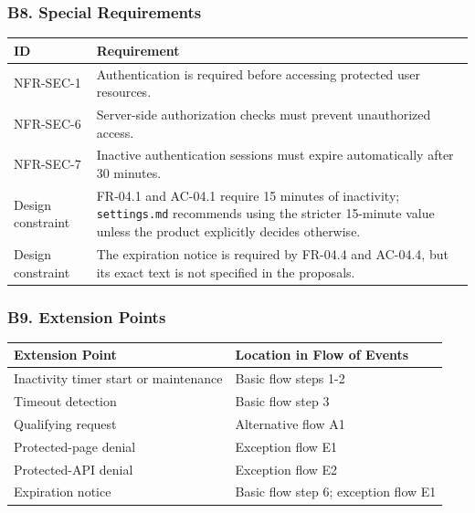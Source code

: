 \documentclass[12pt]{article}
\renewcommand{\baselinestretch}{1.5}
\begin{document}
\hypertarget{sec:b8-special-requirements}{}
\subsubsection*{B8. Special Requirements}
\par\medskip

\begingroup
\small
\renewcommand{\baselinestretch}{1.0}\selectfont
\renewcommand{\arraystretch}{1.15}
\setlength{\tabcolsep}{6pt}
\begin{longtable}{|>{\raggedright\arraybackslash}p{}|>{\raggedright\arraybackslash}p{}|}
\hline
\textbf{ID} & \textbf{Requirement} \\ \hline
\endhead
NFR-SEC-1 & Authentication is required before accessing protected user resources. \\ \hline
NFR-SEC-6 & Server-side authorization checks must prevent unauthorized access. \\ \hline
NFR-SEC-7 & Inactive authentication sessions must expire automatically after 30 minutes. \\ \hline
Design constraint & FR-04.1 and AC-04.1 require 15 minutes of inactivity; \texttt{settings.md} recommends using the stricter 15-minute value unless the product explicitly decides otherwise. \\ \hline
Design constraint & The expiration notice is required by FR-04.4 and AC-04.4, but its exact text is not specified in the proposals. \\ \hline
\end{longtable}
\endgroup
\par\medskip

\hypertarget{sec:b9-extension-points}{}
\subsubsection*{B9. Extension Points}
\par\medskip

\begingroup
\small
\renewcommand{\baselinestretch}{1.0}\selectfont
\renewcommand{\arraystretch}{1.15}
\setlength{\tabcolsep}{6pt}
\begin{longtable}{|>{\raggedright\arraybackslash}p{}|>{\raggedright\arraybackslash}p{}|}
\hline
\textbf{Extension Point} & \textbf{Location in Flow of Events} \\ \hline
\endhead
Inactivity timer start or maintenance & Basic flow steps 1-2 \\ \hline
Timeout detection & Basic flow step 3 \\ \hline
Qualifying request & Alternative flow A1 \\ \hline
Protected-page denial & Exception flow E1 \\ \hline
Protected-API denial & Exception flow E2 \\ \hline
Expiration notice & Basic flow step 6; exception flow E1 \\ \hline
\end{longtable}
\endgroup
\par\medskip
\end{document}
